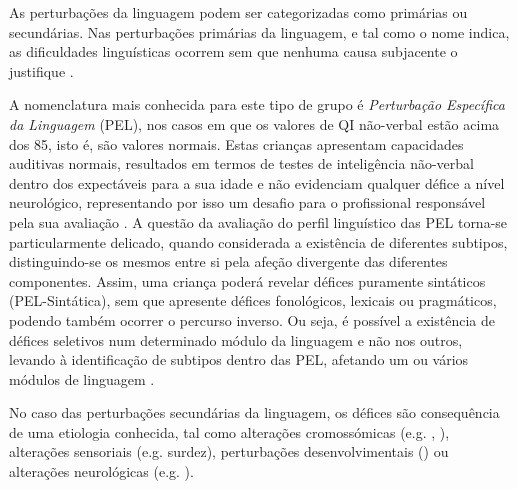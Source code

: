 \documentclass[output=paper]{LSP/langsci}
\begin{document}
As perturbações da linguagem podem ser categorizadas como primárias ou secundárias. Nas perturbações primárias da linguagem, e tal como o nome indica, as dificuldades linguísticas ocorrem sem que nenhuma causa subjacente o justifique \citep{schuele2004}.

A nomenclatura mais conhecida para este tipo de grupo é \textit{Perturbação Específica da Linguagem} (PEL), nos casos em que os valores de QI não-verbal estão acima dos 85, isto é, são valores normais. Estas crianças apresentam capacidades auditivas normais, resultados em termos de testes de inteligência não-verbal dentro dos expectáveis para a sua idade e não evidenciam qualquer défice a nível neurológico, representando por isso um desafio para o profissional responsável pela sua avaliação \citep{leonard2014}. A questão da avaliação do perfil linguístico das PEL torna-se particularmente delicado, quando considerada a existência de diferentes subtipos, distinguindo-se os mesmos entre si pela afeção divergente das diferentes componentes. Assim, uma criança poderá revelar défices puramente sintáticos (PEL-Sintática), sem que apresente défices fonológicos, lexicais ou pragmáticos, podendo também ocorrer o percurso inverso. Ou seja, é possível a existência de défices seletivos num determinado módulo da linguagem e não nos outros, levando à identificação de subtipos dentro das PEL, afetando um ou vários módulos de linguagem \citep{friedmannnovogrodsky2008}.

No caso das perturbações secundárias da linguagem, os défices são consequência de uma etiologia conhecida, tal como alterações cromossómicas (e.g. , ), alterações sensoriais (e.g. surdez), perturbações desenvolvimentais () ou alterações neurológicas (e.g. ). 
\end{document}
